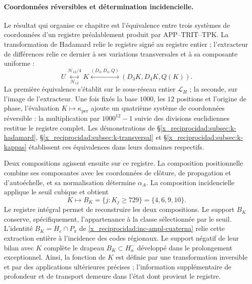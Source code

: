 \paragraph{Coordonnées réversibles et détermination incidencielle.}
\label{x_reciprocidad:ampl-alfa-k-intro-reversible}
Le résultat qui organise ce chapitre est l'équivalence entre trois
systèmes de coordonnées d'un registre préalablement produit par
APP--TRIT--TPK. La transformation de Hadamard relie le registre
signé au registre entier ; l'extracteur de différences relie
ce dernier à ses variations transversales et à sa composante uniforme :
\[
 U\underset{\mathcal H_{12}}{\overset{\mathcal H_{12}/4}{\longleftrightarrow}}K
 \overset{(D_3,D_4,Q)}{\longleftrightarrow}
 (D_3K,D_4K,Q(K)).
\]
La première équivalence s'établit sur le sous-réseau entier
$\mathcal L_H$ ; la seconde, sur l'image de l'extracteur. Une fois fixés la
base $1000$, les $12$ positions et l'origine de phase, l'évaluation
$K\mapsto\kappa_{\mathrm{per}}$ ajoute un quatrième système de coordonnées
réversible : la multiplication par $1000^{12}-1$ suivie des divisions
euclidiennes restitue le registre complet. Les démonstrations de
\S\ref{x_reciprocidad:subsec:k-hadamard}, \S\ref{x_reciprocidad:subsec:k-transversal} et
\S\ref{x_reciprocidad:subsec:k-kappas} établissent ces équivalences dans leurs domaines
respectifs.

Deux compositions agissent ensuite sur ce registre. La composition
positionnelle combine ses composantes avec les coordonnées de clôture,
de propagation et d'autoéchelle, et sa normalisation détermine $\alpha_A$. La
composition incidencielle applique le seuil cubique et obtient
\[
 K\longmapsto B_K=\{j:K_j\geq729\}=\{4,6,9,10\}.
\]
Le registre intégral permet de reconstruire les deux compositions. Le support
$B_K$ conserve, spécifiquement, l'appartenance à la classe sélectionnée
par le seuil. L'identité $B_K=H_e\cap P_\pi$ de
\eqref{x_reciprocidad:inc-ampl-cuaterna} relie cette extraction entière à l'incidence
des codes régionaux. Le support négatif de leur bilan avec $K$
complète le drapeau $B_K\subset H^-_\alpha$ développé dans le
prolongement exceptionnel. Ainsi, la fonction de $K$ est définie par
une transformation inversible et par des applications ultérieures
précises ; l'information supplémentaire de profondeur et de transport demeure
dans l'état dont provient le registre.

